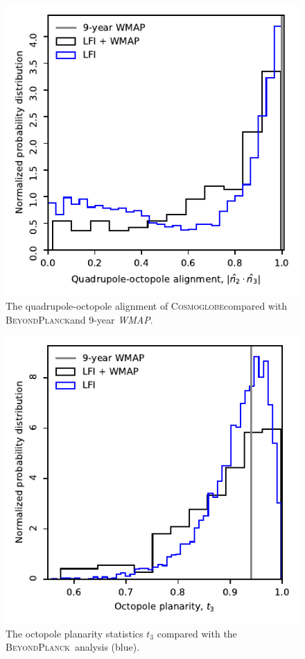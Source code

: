 \documentclass[twocolumn]{../../common/aa}
\def\WMAP{\emph{WMAP}}
\newcommand{\BP}{\textsc{BeyondPlanck}}
\newcommand{\Cosmoglobe}{\textsc{Cosmoglobe}}
\begin{document}
\begin{figure}
	\includegraphics[width=\columnwidth]{figures/WMAP_n_2_n_3.pdf}
	\caption{The quadrupole-octopole alignment of \Cosmoglobe compared with \BP and 9-year \WMAP.}
\end{figure}

\begin{figure}
	\includegraphics[width=\columnwidth]{figures/WMAP_t_3.pdf}
	\caption{The octopole planarity statistics $t_3$ compared with the \BP\ analysis (blue).}
\end{figure}
\end{document}
